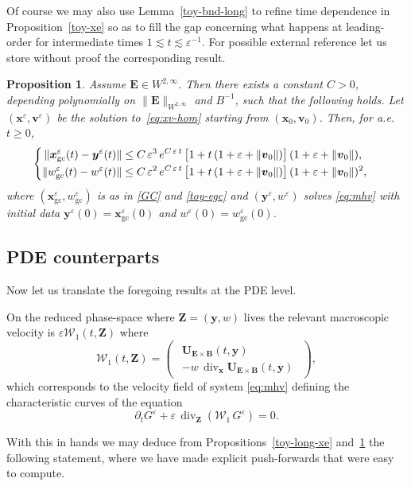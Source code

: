 \documentclass[JEP,XML,SOM,Unicode]{cedram}
\let\mathcal\mathscr
\newenvironment{splitcases}
{\begin{cases}\begin{aligned}}
{\end{aligned}\end{cases}}
\let\eps\varepsilon
\let\d\partial
\DeclareMathOperator{\Div}{div}
\theoremstyle{plain}
\newtheorem{proposition}[theorem]{Proposition}
\theoremstyle{definition}
\newcommand\bp{\begin{pmatrix}}
\newcommand\ep{\end{pmatrix}}
\newcommand{\be}{\begin{equation}}
\newcommand{\ee}{\end{equation}}
\newcommand{\ba}[1]{\begin{array}{#1}}
\newcommand{\ea}{\end{array}}
\newcommand{\bpr}{\begin{proposition}}
\newcommand{\epr}{\end{proposition}}
\newcommand\bB{{\boldsymbol B}}
\newcommand\bE{{\boldsymbol E}}
\newcommand\bU{{\boldsymbol U}}
\newcommand\bfv{{\boldsymbol v}}
\newcommand\bfx{{\boldsymbol x}}
\newcommand\bfy{{\boldsymbol y}}
\newcommand\bfZ{{\boldsymbol Z}}
\newcommand\cW{{\mathcal W}}
\let\e w
\newcommand{\GC}{\bfx_\mathrm{gc}}
\newcommand{\eGC}{w_\mathrm{gc}}
\newcommand{\EcB}{\bU_{\bE\times\bB}}
\begin{document}
Of course we may also use Lemma~\ref{toy-bnd-long} to refine time dependence in Proposition~\ref{toy-xe} so as to fill the gap concerning what happens at leading-order for intermediate times $1\lesssim t\lesssim \eps^{-1}$. For possible external reference let us store without proof the corresponding result.

\bpr
\label{toy-bis-xe}
Assume $\bE\in W^{2,\infty}$. Then there exists a constant $C>0$, depending
polynomially on $\|\bE\|_{W^{2,\infty}}$ and $B^{-1}$, such that the following holds. Let
$(\bfx^\eps,\bfv^\eps)$ be the solution to~\eqref{eq:xv-hom} starting from
$(\bfx_0,\bfv_0)$. Then, for a.e. $t\geq0$,
\[
\begin{splitcases}
\|\GC^\eps(t)-\bfy^\eps(t)\| &\leq C\,\eps^3\,e^{C\,\eps\,t}
\,\bigl[1+t\,(1+\eps+\|\bfv_0\|)\bigr]\,(1+\eps+\|\bfv_0\|),
\\
\|\eGC^\eps(t)-\e^\eps(t)\|&\leq C\,\eps^2\,e^{C\,\eps\,t}\,
\bigl[1+t\,(1+\eps+\|\bfv_0\|)\bigr]\,(1+\eps+\|\bfv_0\|)^2,
\end{splitcases}
\]
where $(\GC^\eps,\eGC^\eps)$ is as in \eqref{GC} and \eqref{toy-egc} and $(\bfy^\eps,\e^\eps)$ solves \eqref{eq:mhv} with initial data $\bfy^\eps(0)=\GC^\eps(0)$ and
$\e^\eps(0)=\eGC^\eps(0)$.
\epr

\subsection{PDE counterparts}

Now let us translate the foregoing results at the PDE level.

On the reduced phase-space where $\bfZ=(\bfy,\e)$ lives the relevant macroscopic velo\-city is $\eps\cW_1(t,\bfZ)$ where
\be
\label{eq:gc2d-1}
\cW_1(t,\bfZ)
= \bp
\ba{l}
\EcB(t,\bfy)
\\[3pt]
-\e \,\Div_{\bfx}\EcB(t,\bfy)
\ea
\ep,
\ee
which corresponds to the velocity field of system \eqref{eq:mhv} defining the characteristic curves of the equation
\be
\label{eq:gc2d-2}
\d_t G^\eps+\eps\,\Div_\bfZ \left(\cW_1\,G^\eps\right)=0.
\ee

With this in hands we may deduce from Propositions~\ref{toy-long-xe} and~\ref{toy-bis-xe} the following statement, where we have made explicit push-forwards that were easy to compute.
\end{document}
